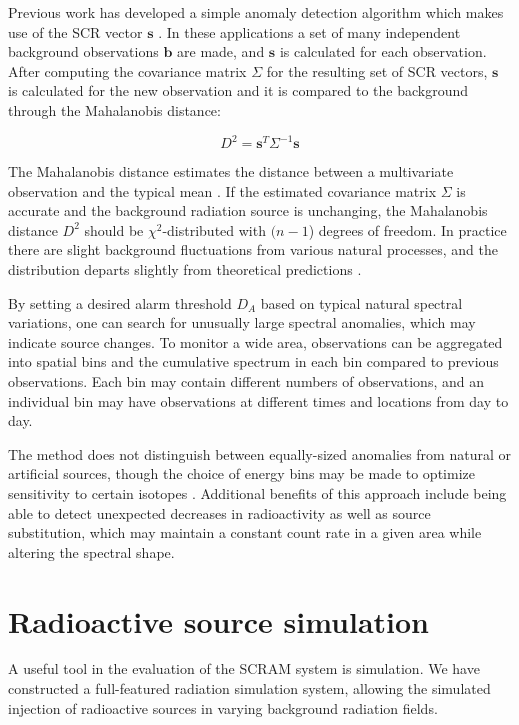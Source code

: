 Previous work has developed a simple anomaly detection algorithm which makes use
of the SCR vector \(\mathbf{s}\) \cite{Pfund:2007}. In these applications a set
of many independent background observations \(\mathbf{b}\) are made, and
\(\mathbf{s}\) is calculated for each observation. After computing the
covariance matrix \(\Sigma\) for the resulting set of SCR vectors,
\(\mathbf{s}\) is calculated for the new observation and it is compared to the
background through the Mahalanobis distance:

\begin{equation}
\label{dist}
D^2 = \mathbf{s}^T \Sigma^{-1} \mathbf{s}
\end{equation}

The Mahalanobis distance estimates the distance between a multivariate
observation and the typical mean \cite{Morrison}.  If the estimated covariance
matrix \(\Sigma\) is accurate and the background radiation source is unchanging,
the Mahalanobis distance \(D^2\) should be \(\chi^2\)-distributed with \((n-1\))
degrees of freedom. In practice there are slight background fluctuations from
various natural processes, and the distribution departs slightly from
theoretical predictions \cite{Pfund:2010hm}.

By setting a desired alarm threshold \(D_A\) based on typical natural spectral
variations, one can search for unusually large spectral anomalies, which may
indicate source changes. To monitor a wide area, observations can be aggregated
into spatial bins and the cumulative spectrum in each bin compared to previous
observations. Each bin may contain different numbers of observations, and an
individual bin may have observations at different times and locations from day
to day.

The method does not distinguish between
equally-sized anomalies from natural or artificial sources, though the choice of
energy bins may be made to optimize sensitivity to certain
isotopes \cite{Pfund:2007}. Additional benefits of this approach include being
able to detect unexpected decreases in radioactivity as well as source
substitution, which may maintain a constant count rate in a given area while
altering the spectral shape.

\section{Radioactive source simulation}
\label{simulation}
A useful tool in the evaluation of the SCRAM system is simulation. We have
constructed a full-featured radiation simulation system, allowing the simulated
injection of radioactive sources in varying background radiation fields.

